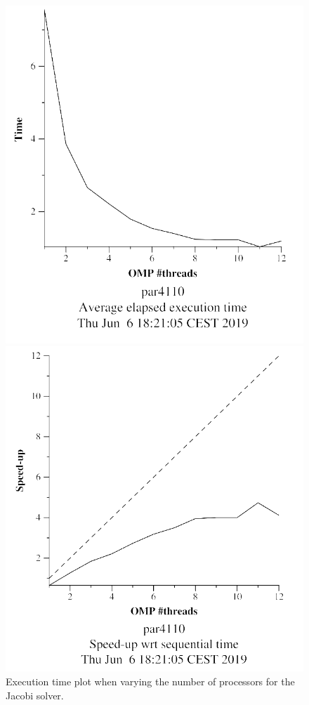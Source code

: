 \documentclass[12pt, a4paper]{article}
\begin{document}
\begin{figure}[H]
\centering
\hspace{-0.5cm}
\begin{minipage}{0.4\linewidth}
  \centering
  \includegraphics[scale=0.5]{./images/heat-omp-strong-jacobi-execution-time}
  \caption{Execution time plot when varying the number of processors for the Jacobi solver.}
  \label{plot:exe-gauss}
\end{minipage}%
\hspace{0.5cm}
\begin{minipage}{0.4\linewidth}
  \centering
  \includegraphics[scale=0.5]{./images/heat-omp-strong-jacobi-speedup}

\end{minipage}
\end{figure}
\end{document}
